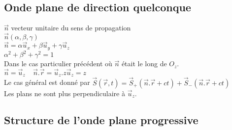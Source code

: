 \documentclass[11pt,a4paper,french]{article}
\begin{document}
\subsection{Onde plane de direction quelconque}
$\vec n$ vecteur unitaire du sens de propagation \\
$\vec n(\alpha,\beta,\gamma)$ \\
$\vec n = \alpha \vec u_x + \beta \vec u_y + \gamma \vec u_z$ \\
$\alpha^2 + \beta^2 + \gamma^2 = 1$ \\
Dans le cas particulier précédent où $\vec n$ était le long de $O_z$. \\
$\vec n = \vec u_z ~~~~~ \vec n.\vec r = \vec u_z .z \vec u_z = z$ \\
Le cas général est donné par $\vec S(\vec r, t) = \vec S_+(\vec n.\vec r + ct) + \vec S_-(\vec n.\vec r + ct)$ \\
Les plans ne sont plus perpendiculaire à $\vec u_z$.
\clearpage
\subsection{Structure de l'onde plane progressive}
\end{document}
